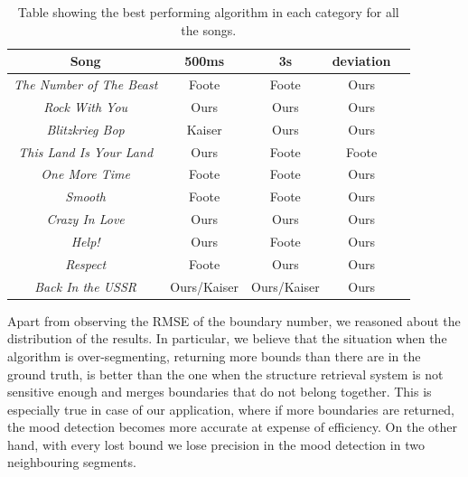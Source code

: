 \begin{table}
\begin{center}
\begin{tabular}{| c | c | c | c | c | } \hline 
Song  											& 	500ms 			&  3s						&  deviation	\\ \hline \hline
\textit{The Number of The Beast} 	&	Foote			& 	Foote  				&  Ours 			\\ \hline
\textit{Rock With You}						&	Ours				&  Ours			  		&  Ours			\\ \hline
\textit{Blitzkrieg Bop} 						&	Kaiser			&  Ours  				&  Ours 			\\ \hline
\textit{This Land Is Your Land} 		&	Ours				&  Foote			  	&  Foote 		\\ \hline
\textit{One More Time}					&	Foote			&  Foote    				&  Ours 			\\ \hline
\textit{Smooth}								&	Foote			&  Foote  				&  Ours 			\\ \hline
\textit{Crazy In Love}						&	Ours				&  Ours  				&  Ours  		\\ \hline
\textit{Help!}									&	Ours				&  Foote		   		&  Ours 			\\ \hline
\textit{Respect}								&	Foote			&  Ours  				&  Ours 			\\ \hline
\textit{Back In the USSR}				&	Ours/Kaiser	&  Ours/Kaiser 		&  Ours		    	\\ \hline

\end{tabular}
\caption{Table showing the best performing algorithm in each category for all the songs.}
\label{table:evalStructureRank}
\end{center}
\end{table}


Apart from observing the RMSE of the boundary number, we reasoned about the distribution of the results. In particular, we believe that the situation when the algorithm is over-segmenting, returning more bounds than there are in the ground truth, is better than the one when the structure retrieval system is not sensitive enough and merges boundaries that do not belong together. This is especially true in case of our application, where if more boundaries are returned, the mood detection becomes more accurate at expense of efficiency. On the other hand, with every lost bound we lose precision in the mood detection in two neighbouring segments.

